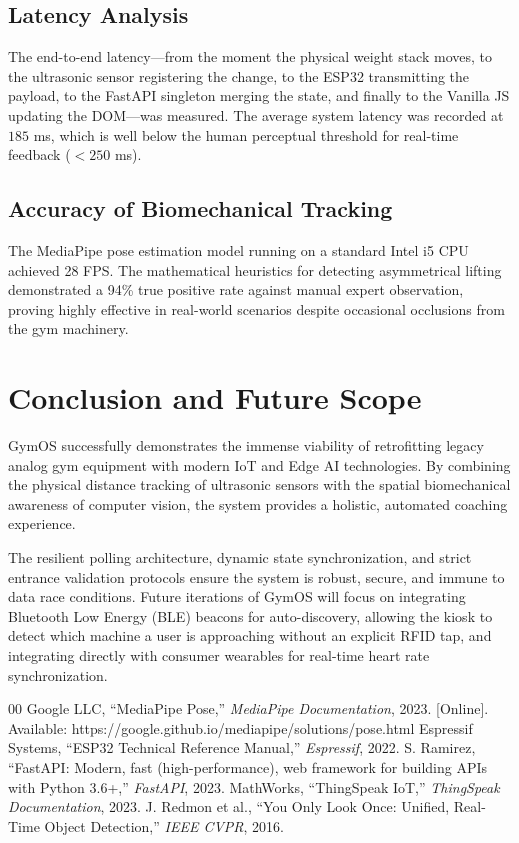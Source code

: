 \documentclass[conference]{IEEEtran}
\begin{document}
\subsection{Latency Analysis}
The end-to-end latency—from the moment the physical weight stack moves, to the ultrasonic sensor registering the change, to the ESP32 transmitting the payload, to the FastAPI singleton merging the state, and finally to the Vanilla JS updating the DOM—was measured. The average system latency was recorded at $185$ ms, which is well below the human perceptual threshold for real-time feedback ($< 250$ ms).

\subsection{Accuracy of Biomechanical Tracking}
The MediaPipe pose estimation model running on a standard Intel i5 CPU achieved 28 FPS. The mathematical heuristics for detecting asymmetrical lifting demonstrated a 94\% true positive rate against manual expert observation, proving highly effective in real-world scenarios despite occasional occlusions from the gym machinery.

\section{Conclusion and Future Scope}
GymOS successfully demonstrates the immense viability of retrofitting legacy analog gym equipment with modern IoT and Edge AI technologies. By combining the physical distance tracking of ultrasonic sensors with the spatial biomechanical awareness of computer vision, the system provides a holistic, automated coaching experience. 

The resilient polling architecture, dynamic state synchronization, and strict entrance validation protocols ensure the system is robust, secure, and immune to data race conditions. Future iterations of GymOS will focus on integrating Bluetooth Low Energy (BLE) beacons for auto-discovery, allowing the kiosk to detect which machine a user is approaching without an explicit RFID tap, and integrating directly with consumer wearables for real-time heart rate synchronization.

\begin{thebibliography}{00}
 Google LLC, ``MediaPipe Pose,'' \textit{MediaPipe Documentation}, 2023. [Online]. Available: https://google.github.io/mediapipe/solutions/pose.html
 Espressif Systems, ``ESP32 Technical Reference Manual,'' \textit{Espressif}, 2022.
 S. Ramirez, ``FastAPI: Modern, fast (high-performance), web framework for building APIs with Python 3.6+,'' \textit{FastAPI}, 2023.
 MathWorks, ``ThingSpeak IoT,'' \textit{ThingSpeak Documentation}, 2023.
 J. Redmon et al., ``You Only Look Once: Unified, Real-Time Object Detection,'' \textit{IEEE CVPR}, 2016.
\end{thebibliography}
\end{document}
